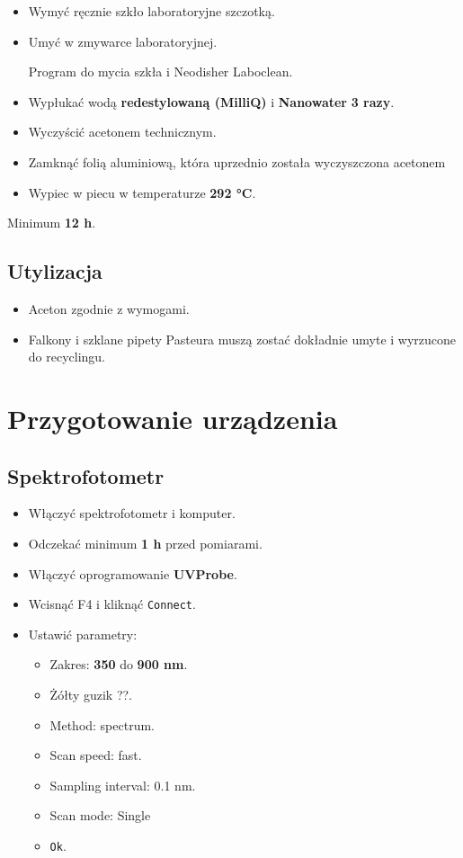 \documentclass[
  letterpaper,
  DIV=11,
  numbers=noendperiod]{scrreprt}
\begin{document}
\begin{itemize}
\item
  Wymyć ręcznie szkło laboratoryjne szczotką.
\item
  Umyć w zmywarce laboratoryjnej.

  Program do mycia szkła i Neodisher Laboclean.
\item
  Wypłukać wodą \textbf{redestylowaną (MilliQ)} i \textbf{Nanowater}
  \textbf{3 razy}.
\item
  Wyczyścić acetonem technicznym.
\item
  Zamknąć folią aluminiową, która uprzednio została wyczyszczona
  acetonem
\item
  Wypiec w piecu w temperaturze \textbf{292 °C}.
\end{itemize}

Minimum \textbf{12 h}.

\hypertarget{utylizacja-1}{%
\subsection{Utylizacja}\label{utylizacja-1}}

\begin{itemize}
\item
  Aceton zgodnie z wymogami.
\item
  Falkony i szklane pipety Pasteura muszą zostać dokładnie umyte i
  wyrzucone do recyclingu.
\end{itemize}

\hypertarget{przygotowanie-urzux105dzenia}{%
\section{Przygotowanie urządzenia}\label{przygotowanie-urzux105dzenia}}

\hypertarget{spektrofotometr}{%
\subsection{Spektrofotometr}\label{spektrofotometr}}

\begin{itemize}
\item
  Włączyć spektrofotometr i komputer.
\item
  Odczekać minimum \textbf{1 h} przed pomiarami.
\item
  Włączyć oprogramowanie \textbf{UVProbe}.
\item
  Wcisnąć F4 i kliknąć \texttt{Connect}.
\item
  Ustawić parametry:

  \begin{itemize}
  \item
    Zakres: \textbf{350} do \textbf{900 nm}.
  \item
    Żółty guzik ??.
  \item
    Method: spectrum.
  \item
    Scan speed: fast.
  \item
    Sampling interval: 0.1 nm.
  \item
    Scan mode: Single
  \item
    \texttt{Ok}.
  \end{itemize}
\end{itemize}
\end{document}
